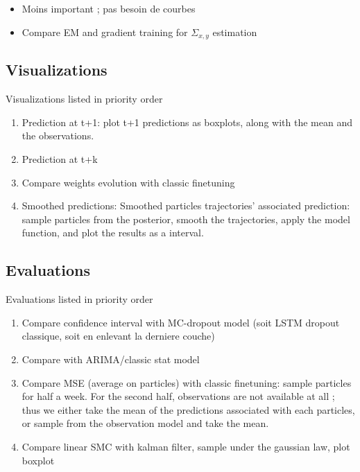 \documentclass{article}
\begin{document}
\begin{itemize}
	\item Moins important ; pas besoin de courbes
	\item Compare EM and gradient training for $\Sigma_{x, y}$ estimation
\end{itemize}

\subsection{Visualizations}%
\label{sub:visualizations}

Visualizations listed in priority order
\begin{enumerate}
	\item Prediction at t+1: plot t+1 predictions as boxplots, along with the mean and the observations.
	\item Prediction at t+k
	\item Compare weights evolution with classic finetuning
	\item Smoothed predictions: Smoothed particles trajectories' associated prediction: sample particles from the posterior, smooth the trajectories, apply the model function, and plot the results as a interval.
\end{enumerate}

\subsection{Evaluations}%
\label{sub:evaluations}

Evaluations listed in priority order
\begin{enumerate}
	\item Compare confidence interval with MC-dropout model (soit LSTM dropout classique, soit en enlevant la derniere couche)
	\item Compare with ARIMA/classic stat model
	\item Compare MSE (average on particles) with classic finetuning: sample particles for half a week. For the second half, observations are not available at all ; thus we either take the mean of the predictions associated with each particles, or sample from the observation model and take the mean.
	\item Compare linear SMC with kalman filter, sample under the gaussian law, plot boxplot
\end{enumerate}


\end{document}

